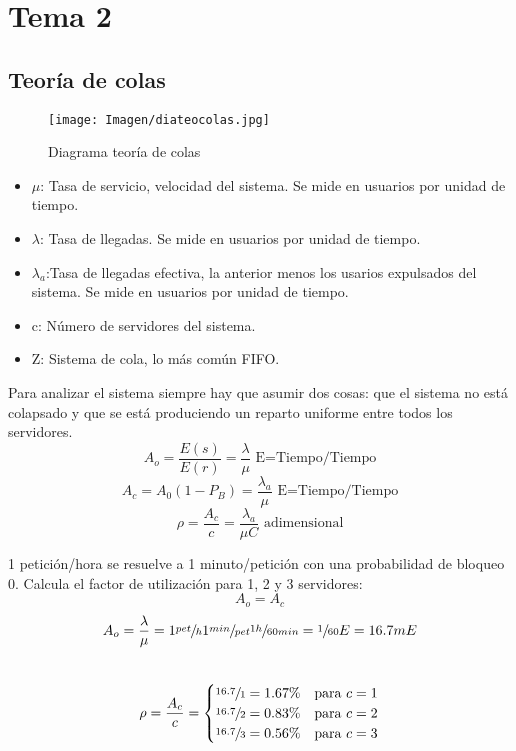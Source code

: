 \section{Tema 2}
\subsection{Teoría de colas}
\begin{figure}[H]
\centering
\texttt{[image: Imagen/diateocolas.jpg]}
\caption{Diagrama teoría de colas}
\label{dia:teocolas}
\end{figure}

\begin{itemize}
	\item $\mu$: Tasa de servicio, velocidad del sistema. Se mide en usuarios por unidad de tiempo.\\
	\item $\lambda$: Tasa de llegadas. Se mide en usuarios por unidad de tiempo.\\
	\item $\lambda_a$:Tasa de llegadas efectiva, la anterior menos los usarios expulsados del sistema. Se mide en usuarios por unidad de tiempo.\\
	\item c: Número de servidores del sistema.\\
	\item Z: Sistema de cola, lo más común FIFO.\\
\end{itemize}
Para analizar el sistema siempre hay que asumir dos cosas: que el sistema no está colapsado y que se está produciendo un reparto uniforme entre todos los servidores.\\
\begin{equation}%
A_o=\frac{E(s)}{E(r)}=\frac{\lambda}{\mu}\text{ E=Tiempo/Tiempo}
\end{equation}
\begin{equation}%
A_c=A_0(1-P_B)=\frac{\lambda_a}{\mu}\text{ E=Tiempo/Tiempo}
\end{equation}
\begin{equation}%
\rho=\frac{A_c}{c}=\frac{\lambda_a}{\mu C}\text{ adimensional}
\end{equation}
\begin{example}
1 petición/hora se resuelve a 1 minuto/petición con una probabilidad de bloqueo 0. Calcula el factor de utilización para 1, 2 y 3 servidores:\\
\[A_o=A_c\]
\[A_o=\frac{\lambda}{\mu}=1\sfrac{pet}{h}1\sfrac{min}{pet}\sfrac{1h}{60min}=\sfrac{1}{60}E=16.7mE\]\\
\[\rho=\frac{A_c}{c}=
\begin{cases}
\sfrac{16.7}{1}=1.67\% & \text{para } c=1\\
\sfrac{16.7}{2}=0.83\% & \text{para } c=2\\
\sfrac{16.7}{3}=0.56\% & \text{para } c=3
\end{cases}\]
\end{example}

